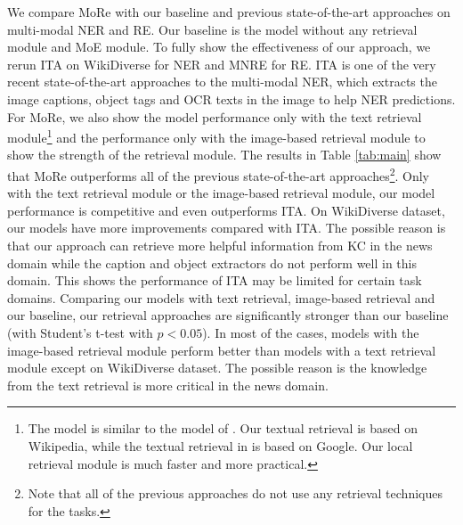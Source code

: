 \documentclass[11pt]{article}
\begin{document}
We compare MoRe with our baseline and previous state-of-the-art approaches on multi-modal NER and RE. Our baseline is the model without any retrieval module and MoE module. To fully show the effectiveness of our approach, we rerun ITA on WikiDiverse for NER and MNRE for RE. ITA is one of the very recent state-of-the-art approaches to the multi-modal NER, which extracts the image captions, object tags and OCR texts in the image to help NER predictions. For MoRe, we also show the model performance only with the text retrieval module\footnote{
The model is similar to the model of \citet{wang-etal-2021-improving}. Our textual retrieval is based on Wikipedia, while the textual retrieval in \citet{wang-etal-2021-improving} is based on Google. Our local retrieval module is much faster and more practical.} and the performance only with the image-based retrieval module to show the strength of the retrieval module. The results in Table \ref{tab:main} show that MoRe outperforms all of the previous state-of-the-art approaches\footnote{Note that all of the previous approaches do not use any retrieval techniques for the tasks.}. Only with the text retrieval module or the image-based retrieval module, our model performance is competitive and even outperforms ITA. On WikiDiverse dataset, our models have more improvements compared with ITA. The possible reason is that our approach can retrieve more helpful information from KC in the news domain while the caption and object extractors do not perform well in this domain. This shows the performance of ITA may be limited for certain task domains. Comparing our models with text retrieval, image-based retrieval and our baseline, our retrieval approaches are significantly stronger than our baseline (with Student's t-test with $p<0.05$). In most of the cases, models with the image-based retrieval module perform better than models with a text retrieval module except on WikiDiverse dataset. The possible reason is the knowledge from the text retrieval is more critical in the news domain.
\end{document}
